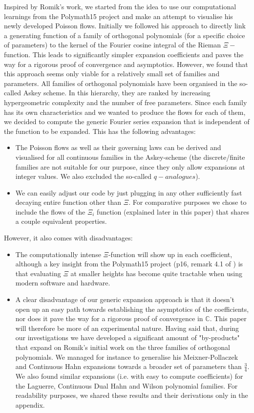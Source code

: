 \documentclass[a4paper,11pt,twoside]{amsart}
\begin{document}
Inspired by Romik's work, we started from the idea to use our computational learnings from the Polymath15 project and make an attempt to visualise his newly developed Poisson flows. Initially we followed his approach to directly link a generating function of a family of orthogonal polynomials (for a specific choice of parameters) to the kernel of the Fourier cosine integral of the Rieman $\Xi-$function. This leads to significantly simpler expansion coefficients and paves the way for a rigorous proof of convergence and asymptotics. However, we found that this approach seems only viable for a relatively small set of families and parameters. All families of orthogonal polynomials have been organised in the so-called Askey scheme. In this hierarchy, they are ranked by increasing hypergeometric complexity and the number of free parameters. Since each family has its own characteristics and we wanted to produce the flows for each of them, we decided to compute the generic Fourier series expansion that is independent of the function to be expanded. This has the following advantages: 
\begin{itemize}
\item The Poisson flows as well as their governing laws can be derived and visualised for all continuous families in the Askey-scheme (the discrete/finite families are not suitable for our purpose, since they only allow expansions at integer values. We also excluded the so-called $q-analogues$).
\item We can easily adjust our code by just plugging in any other sufficiently fast decaying entire function other than $\Xi$. For comparative purposes we chose to include the flows of the $\Xi_i$ function (explained later in this paper) that shares a couple equivalent properties. 
\end{itemize}
However, it also comes with disadvantages:
\begin{itemize}
\item The computationally intense $\Xi$-function will show up in each coefficient, although a key insight from the Polymath15 project (p16, remark 4.1 of \cite{pol}) is that evaluating $\Xi$ at smaller heights has become quite tractable when using modern software and hardware.
\item A clear disadvantage of our generic expansion approach is that it doesn't open up an easy path towards establishing the asymptotics of the coefficients, nor does it pave the way for a rigorous proof of convergence in $\mathbb{C}$. This paper will therefore be more of an experimental nature. Having said that, during our investigations we have developed a significant amount of "by-products" that expand on Romik's initial work on the three families of orthogonal polynomials. We managed for instance to generalise his Meixner-Pollaczek and Continuous Hahn expansions towards a broader set of parameters than $\frac34$. We also found similar expansions (i.e. with easy to compute coefficients) for the Laguerre, Continuous Dual Hahn and Wilson polynomial families. For readability purposes, we shared these results and their derivations only in the appendix.  
\end{itemize}
\end{document}

